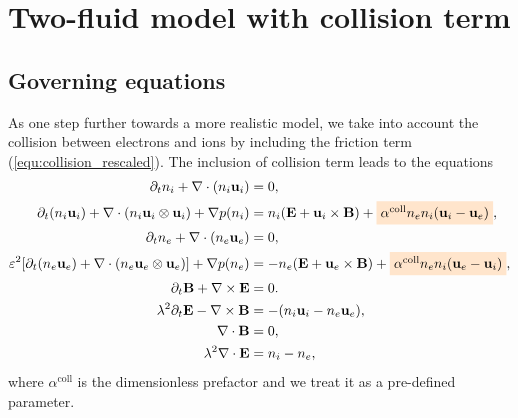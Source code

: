 \documentclass{report}
\begin{document}
\section{Two-fluid model with collision term} \label{sec:1d2f_coll}
\subsection{Governing equations}
As one step further towards a more realistic model, we take into account the collision between electrons and ions by including the friction term (\ref{equ:collision_rescaled}). The inclusion of collision term leads to the equations
\begin{align*}
    \partial_t n_i + \nabla\cdot(n_i \mathbf{u}_i) &= 0, \\
    \partial_t (n_i \mathbf{u}_i) + \nabla \cdot (n_i \mathbf{u}_i \otimes \mathbf{u}_i) + \nabla p(n_i) &= n_i(\mathbf{E} + \mathbf{u}_i \times \mathbf{B}) + \colorbox{orange!20}{$\alpha^\text{coll} n_en_i(\mathbf{u}_i - \mathbf{u}_e)$},\\
    \partial_t n_e + \nabla\cdot(n_e \mathbf{u}_e) &= 0, \\
    \varepsilon^2[\partial_t (n_e \mathbf{u}_e) + \nabla \cdot (n_e \mathbf{u}_e \otimes \mathbf{u}_e)] + \nabla p(n_e) &= -n_e(\mathbf{E} + \mathbf{u}_e \times \mathbf{B}) + \colorbox{orange!20}{$\alpha^\text{coll}  n_en_i(\mathbf{u}_e - \mathbf{u}_i)$},\\
    \partial_t \mathbf{B} + \nabla \times \mathbf{E} &= 0. \\
    \lambda^2 \partial_t\mathbf{E} - \nabla \times \mathbf{B} &= -(n_i \mathbf{u}_i - n_e \mathbf{u}_e),\\
    \nabla\cdot \mathbf{B} &= 0, \\
    \lambda^2 \nabla\cdot \mathbf{E} &= n_i - n_e,
\end{align*}
where $\alpha^\text{coll}$ is the dimensionless prefactor and we treat it as a pre-defined parameter.
\end{document}
